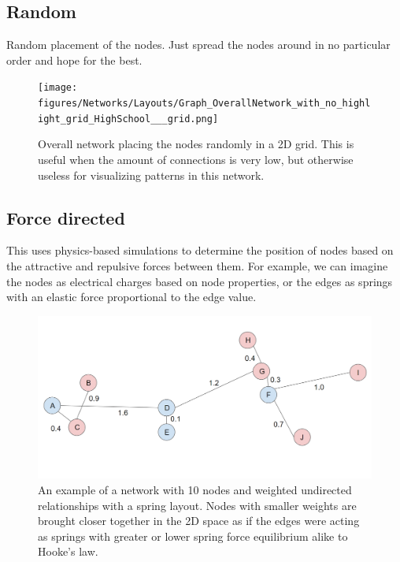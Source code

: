 \subsection{Random}

Random placement of the nodes. Just spread the nodes around in no particular order and hope for the best.

    \begin{figure}[H]
        \centering
            \texttt{[image: figures/Networks/Layouts/Graph\_OverallNetwork\_with\_no\_highlight\_grid\_HighSchool\_\_\_grid.png]} 
        \caption{Overall network placing the nodes randomly in a 2D grid. This is useful when the amount of connections is very low, but otherwise useless for visualizing patterns in this network.}
        \label{figure:networksLayoutsGRID}
    \end{figure}

\newpage

\subsection{Force directed}

This uses physics-based simulations to determine the position of nodes based on the attractive and repulsive forces between them. For example, we can imagine the nodes as electrical charges based on node properties, or the edges as springs with an elastic force proportional to the edge value.

    \begin{figure}[h!]
        \centering
            \includegraphics[width=0.7\linewidth]{figures/Networks/Concepts/edgesSpring.png} 
        \caption{An example of a network with 10 nodes and weighted undirected relationships with a spring layout. Nodes with smaller weights are brought closer together in the 2D space as if the edges were acting as springs with greater or lower spring force equilibrium alike to Hooke’s law.}
        \label{figure:networkExampleSpring}
    \end{figure}

